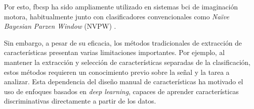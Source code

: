 Por esto, \acrshort{fbcsp} ha sido ampliamente utilizado en sistemas \acrshort{bci} de imaginación motora, habitualmente junto con clasificadores convencionales como \textit{Naïve Bayesian Parzen Window} (NVPW) \cite{ang_FilterBank2008,ang_FilterBank2012}.

Sin embargo, a pesar de su eficacia, los métodos tradicionales de extracción de características presentan varias limitaciones importantes. Por ejemplo, al mantener la extracción y selección de características separadas de la clasificación, estos métodos requieren un conocimiento previo sobre la señal y la tarea a analizar. Esta dependencia del diseño manual de características ha motivado el uso de enfoques basados en \textit{deep learning}, capaces de aprender características discriminativas directamente a partir de los datos.
